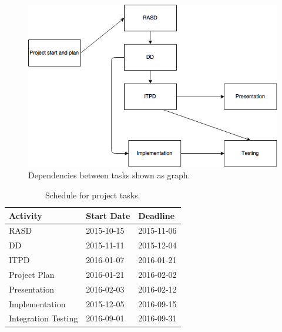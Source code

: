 \begin{figure}
    \centering
    \includegraphics[width=\textwidth]{img/tasks-dep-graph.jpg}
    \caption{Dependencies between tasks shown as graph.}
    \label{fig:tasks-dep-graph}
\end{figure}

\begin{table}[p]
    \centering
    \begin{tabular}{| l | l | l |}
        \hline
        \textbf{Activity}   & \textbf{Start Date}   & \textbf{Deadline} \\
        \hline
        RASD                & 2015-10-15            & 2015-11-06        \\
        DD                  & 2015-11-11            & 2015-12-04        \\
        ITPD                & 2016-01-07            & 2016-01-21        \\
        Project Plan        & 2016-01-21            & 2016-02-02        \\
        Presentation        & 2016-02-03            & 2016-02-12        \\
        Implementation      & 2015-12-05            & 2016-09-15        \\
        Integration Testing & 2016-09-01            & 2016-09-31        \\
        \hline
    \end{tabular}
    \caption{Schedule for project tasks.}
    \label{tab:schedule}
\end{table}

